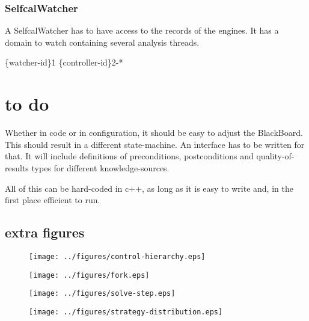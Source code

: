 \documentclass[]{lofar}
\begin{document}
      \subsubsection{SelfcalWatcher}
      \label{subsubsec:SelfcalWatcher}\hypertarget{subsubsec:SelfcalWatcher}{}

        A SelfcalWatcher has to have access to the records of the
        engines. It has a domain to watch containing several analysis
        threads.

        \{watcher-id\}1 \{controller-id\}2-*

  \section{to do}
  \label{sec:todo}\hypertarget{sec:todo}{}

    Whether in code or in configuration, it should be easy to adjust
    the BlackBoard. This should result in a different
    state-machine. An interface has to be written for that. It will
    include definitions of preconditions, postconditions and
    quality-of-results types for different knowledge-sources.

    All of this can be hard-coded in c++, as long as it is easy to
    write and, in the first place efficient to run.

    \subsection{extra figures}
    \begin{figure}
      \texttt{[image: ../figures/control-hierarchy.eps]}
    \end{figure}

    \begin{figure}
      \texttt{[image: ../figures/fork.eps]}
    \end{figure}

    \begin{figure}
      \texttt{[image: ../figures/solve-step.eps]}
    \end{figure}

    \begin{figure}
      \texttt{[image: ../figures/strategy-distribution.eps]}
    \end{figure}

\newcommand{\dbappendix}[1]{\section{#1}}%
\end{document}
